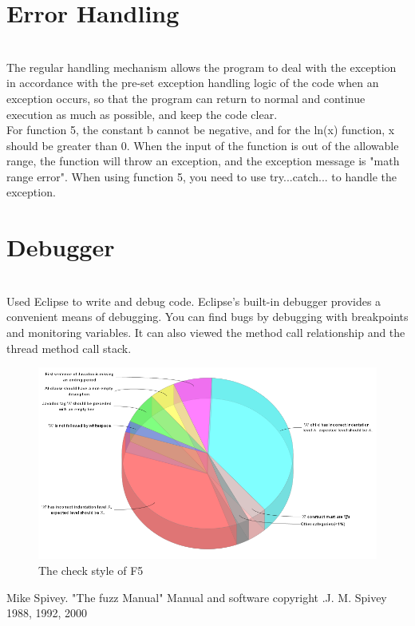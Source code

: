 \documentclass[letterpaper, 11pt]{report}
\begin{document}
 \section*{{Error Handling}}
\\The regular handling mechanism allows the program to deal with the exception in accordance with the pre-set exception handling logic of the code when an exception occurs, so that the program can return to normal and continue execution as much as possible, and keep the code clear.
\\For function 5, the constant b cannot be negative, and for the ln(x) function, x should be greater than 0. When the input of the function is out of the allowable range, the function will throw an exception, and the exception message is "math range error". When using function 5, you need to use try...catch... to handle the exception.
\section*{{Debugger}}
\\Used Eclipse to write and debug code. Eclipse's built-in debugger provides a convenient means of debugging. You can find bugs by debugging with breakpoints and monitoring variables. It can also viewed the method call relationship and the thread method call stack.
 \begin{figure}[htp]
    \centering
    \includegraphics[width=16cm]{F5p4}
    \caption{The check style of F5}
    \label{fig:galaxy}
\end{figure}
 \begin{center} 


 
 
 
 
 \end{center}
  \begin{thebibliography}{}
 
Mike Spivey. "The fuzz Manual" Manual and software copyright .J. M. Spivey 1988, 1992, 2000


\end{thebibliography}   
 
\end{document}
